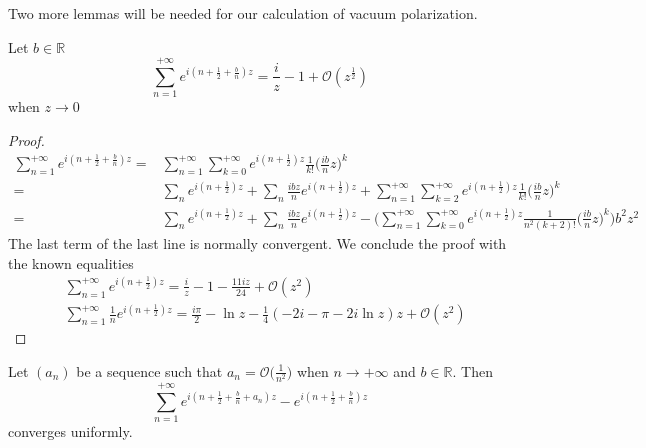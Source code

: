 Two more lemmas will be needed for our calculation of vacuum polarization.
\begin{lemma}
Let $b\in\mathbb{R}$
\begin{equation*}
\sum_{n=1}^{+\infty} e^{i(n + \frac 1 2+\frac b n)z} = \frac i z - 1 + \mathcal{O}(z^{\frac 1 2})
\end{equation*}
when $z\rightarrow 0 $
\end{lemma}
\begin{proof}
\begin{equation*}
\begin{split}
\sum_{n=1}^{+\infty} e^{i(n + \frac 1 2 +\frac b n)z} = & 
\sum_{n=1}^{+\infty} \sum_{k=0}^{+\infty} e^{i(n + \frac 1 2)z} \frac{1}{k!}\big(\frac{ib}{n}z\big)^k \\
%
= & \sum_n e^{i(n+\frac 1 2 )z} + \sum_n \frac{ibz}{n}e^{i(n+\frac 1 2 )z} + \sum_{n=1}^{+\infty} \sum_{k=2}^{+\infty} e^{i(n+\frac 1 2)z} \frac{1}{k!}\big(\frac{ib}{n}z\big)^k  \\
%
= & \sum_n e^{i(n+\frac 1 2)z} + \sum_n \frac{ibz}{n}e^{i(n+\frac 1 2)z} - 
\bigg(\sum_{n=1}^{+\infty} \sum_{k=0}^{+\infty} 
e^{i(n+\frac 1 2)z} \frac{1}{n^2(k+2)!}\big(\frac{ib}{n}z\big)^k 
\bigg)b^2z^2
\end{split}
\end{equation*}
The last term of the last line is normally convergent.
We conclude the proof with the known equalities
\begin{equation*}
\begin{split}
& \sum_{n=1}^{+\infty}e^{i(n + \frac 1 2 )z} = 
\frac i z - 1 - \frac{11iz}{24} + \mathcal{O}(z^2) \\
%
& \sum_{n=1}^{+\infty}\frac 1 n e^{i(n+\frac 1 2)z} =
\frac{i\pi}{2} - \ln z - \frac 1 4 (-2i - \pi - 2i\ln z)z + \mathcal{O}(z^2)
\end{split}
\end{equation*}
\end{proof}
%
\begin{lemma}
Let $(a_n)$ be a sequence such that $a_n = \mathcal{O}\big(\frac{1}{n^2})$ when $n\rightarrow+\infty$ and $b\in\mathbb{R}$. Then
\begin{equation*}
\sum_{n=1}^{+\infty} e^{i(n+\frac 1 2+\frac{b}{n}+a_n)z } - e^{i(n+\frac 1 2+\frac{b}{n})z }
\end{equation*}
converges uniformly.
\end{lemma}
